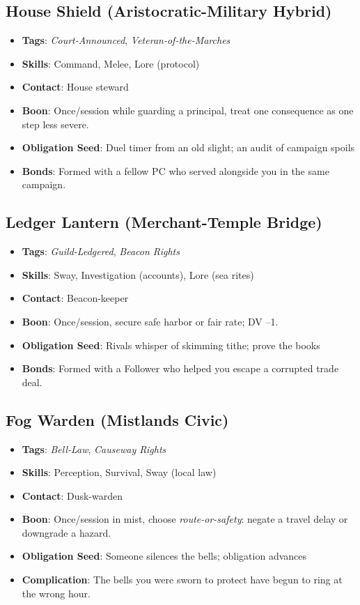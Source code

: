 \subsection*{House Shield (Aristocratic-Military Hybrid)}
\begin{itemize}
\item \textbf{Tags}: \textit{Court-Announced}, \textit{Veteran-of-the-Marches}
\item \textbf{Skills}: Command, Melee, Lore (protocol)
\item \textbf{Contact}: House steward
\item \textbf{Boon}: Once/session while guarding a principal, treat one consequence as one step less severe.
\item \textbf{Obligation Seed}: Duel timer from an old slight; an audit of campaign spoils
\item \textbf{Bonds}: Formed with a fellow PC who served alongside you in the same campaign.
\end{itemize}

\subsection*{Ledger Lantern (Merchant-Temple Bridge)}
\begin{itemize}
\item \textbf{Tags}: \textit{Guild-Ledgered}, \textit{Beacon Rights}
\item \textbf{Skills}: Sway, Investigation (accounts), Lore (sea rites)
\item \textbf{Contact}: Beacon-keeper
\item \textbf{Boon}: Once/session, secure safe harbor or fair rate; DV --1.
\item \textbf{Obligation Seed}: Rivals whisper of skimming tithe; prove the books
\item \textbf{Bonds}: Formed with a Follower who helped you escape a corrupted trade deal.
\end{itemize}

\subsection*{Fog Warden (Mistlands Civic)}
\begin{itemize}
\item \textbf{Tags}: \textit{Bell-Law}, \textit{Causeway Rights}
\item \textbf{Skills}: Perception, Survival, Sway (local law)
\item \textbf{Contact}: Dusk-warden
\item \textbf{Boon}: Once/session in mist, choose \emph{route-or-safety}: negate a travel delay or downgrade a hazard.
\item \textbf{Obligation Seed}: Someone silences the bells; obligation advances
\item \textbf{Complication}: The bells you were sworn to protect have begun to ring at the wrong hour.
\end{itemize}

